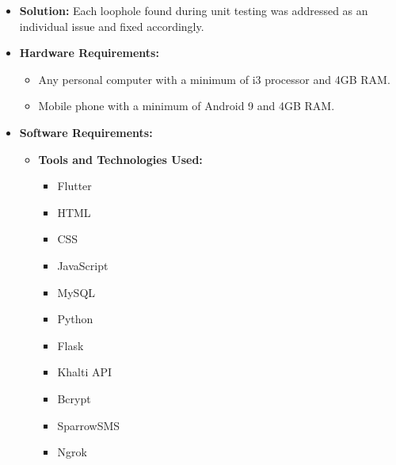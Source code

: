 \documentclass[a4paper,14pt]{article}
\begin{document}
{{{{{{{{{{{\begin{itemize}
\begin{itemize}
				\item \textbf{Solution:} Each loophole found during unit testing was addressed as an individual issue and fixed accordingly.
				
			\end{itemize}
		\end{itemize}
		\vspace{0.5cm}
		\newpage
		{
			\noindent \normalsize
			\justifying \begin{itemize}
				\item \textbf{Hardware Requirements:}
				\begin{itemize}
					\item Any personal computer with a minimum of i3 processor and 4GB RAM.
					\item Mobile phone with a minimum of Android 9 and 4GB RAM.
				\end{itemize}
				
				\item \textbf{Software Requirements:}
				\begin{itemize}
					\item \textbf{Tools and Technologies Used:}
					\begin{itemize}
						\item Flutter
						\item HTML
						\item CSS
						\item JavaScript
						\item MySQL
						\item Python
						\item Flask
						\item Khalti API
						\item Bcrypt
						\item SparrowSMS
						\item Ngrok
						
					\end{itemize}
				\end{itemize}
			\end{itemize}
			
		\vspace{0.5cm}
		
		\newpage
		
}}}}}}}}}}}}
\end{document}
